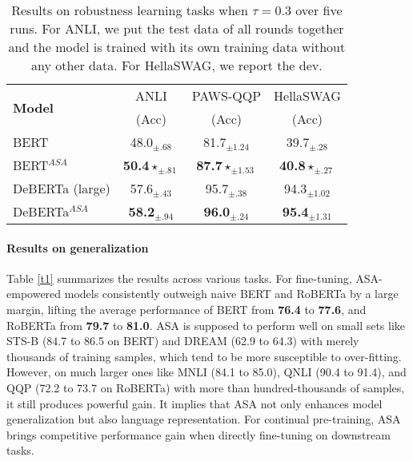 \documentclass[letterpaper]{article} \usepackage{aaai23}  \usepackage{times}  \usepackage{helvet}  \usepackage{courier}  \usepackage[hyphens]{url}  \usepackage{graphicx} \urlstyle{rm} \def\UrlFont{\rm}  \usepackage{natbib}  \usepackage{caption} \frenchspacing  \setlength{\pdfpagewidth}{8.5in}  \setlength{\pdfpageheight}{11in}  \usepackage{algorithm}
\begin{document}
\begin{table}
\centering
\small
\begin{tabular}{@{}lccc@{}}
\toprule
\multirow{2}{*}{\textbf{Model}} & ANLI                          & PAWS-QQP                       & HellaSWAG               \\
                                & (Acc)                         & (Acc)                          & (Acc)                   \\ \midrule
BERT                            & 48.0$_{\pm.68}$               & 81.7$_{\pm1.24}$               & 39.7$_{\pm.28}$          \\
BERT$^{ASA}$                    & \textbf{50.4}$\star_{\pm.81}$ & \textbf{87.7}$\star_{\pm1.53}$ & \textbf{40.8}$\star_{\pm.27}$ \\ \midrule
DeBERTa (large)                 & 57.6$_{\pm.43}$               & 95.7$_{\pm.38}$                & 94.3$_{\pm1.02}$              \\
DeBERTa$^{ASA}$                 & \textbf{58.2}$_{\pm.94}$      & \textbf{96.0}$_{\pm.24}$       & \textbf{95.4}$_{\pm1.31}$      \\ \bottomrule
\end{tabular}
\caption{Results on robustness learning tasks when $ \tau = 0.3 $ over five runs. For ANLI, we put the test data of all rounds together and the model is trained with its own training data without any other data. For HellaSWAG, we report the dev.}
\label{t2}
\end{table}

\paragraph{Results on generalization} Table \ref{t1} summarizes the results across various tasks. For fine-tuning, ASA-empowered models consistently outweigh naive BERT and RoBERTa by a large margin, lifting the average performance of BERT from \textbf{76.4} to \textbf{77.6}, and RoBERTa from \textbf{79.7} to \textbf{81.0}. ASA is supposed to perform well on small sets like STS-B (84.7 to 86.5 on BERT) and DREAM (62.9 to 64.3) with merely thousands of training samples, which tend to be more susceptible to over-fitting. However, on much larger ones like MNLI (84.1 to 85.0), QNLI (90.4 to 91.4), and QQP (72.2 to 73.7 on RoBERTa) with more than hundred-thousands of samples, it still produces powerful gain. It implies that ASA not only enhances model generalization but also language representation. For continual pre-training, ASA brings competitive performance gain when directly fine-tuning on downstream tasks.
\end{document}
